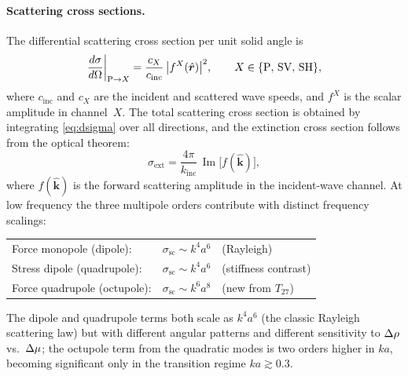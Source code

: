 \paragraph{Scattering cross sections.}
The differential scattering cross section per unit solid angle is
\begin{equation}
  \frac{d\sigma}{d\Omega}\bigg|_{\mathrm{P}\to X}
  = \frac{c_X}{c_{\mathrm{inc}}}\,
    \bigl|f^X(\hat{\bm{r}})\bigr|^2,
  \qquad X \in \{\mathrm{P},\,\mathrm{SV},\,\mathrm{SH}\},
  \label{eq:dsigma}
\end{equation}
where $c_{\mathrm{inc}}$ and $c_X$ are the incident and scattered wave
speeds, and $f^X$ is the scalar amplitude in channel~$X$.
The total scattering cross section is obtained by integrating
\eqref{eq:dsigma} over all directions, and the extinction cross section
follows from the optical theorem:
\begin{equation}
  \sigma_{\mathrm{ext}}
  = \frac{4\pi}{k_{\mathrm{inc}}}\,
    \operatorname{Im}\!\bigl[f(\hat{\bm{k}})\bigr],
  \label{eq:optical-theorem}
\end{equation}
where $f(\hat{\bm{k}})$ is the forward scattering amplitude in the
incident-wave channel.  At low frequency the three multipole orders
contribute with distinct frequency scalings:
\begin{center}
\renewcommand{\arraystretch}{1.3}
\begin{tabular}{lll}
Force monopole (dipole): & $\sigma_{\mathrm{sc}} \sim k^4 a^6$
  & (Rayleigh) \\
Stress dipole (quadrupole): & $\sigma_{\mathrm{sc}} \sim k^4 a^6$
  & (stiffness contrast) \\
Force quadrupole (octupole): & $\sigma_{\mathrm{sc}} \sim k^6 a^8$
  & (new from $T_{27}$)
\end{tabular}
\end{center}
The dipole and quadrupole terms both scale as $k^4 a^6$ (the classic
Rayleigh scattering law) but with different angular patterns and
different sensitivity to $\Delta\rho$ vs.\ $\Delta\mu$; the octupole term from
the quadratic modes is two orders higher in $ka$, becoming significant
only in the transition regime $ka \gtrsim 0.3$.

